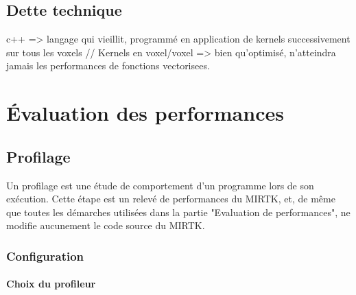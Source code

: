 \documentclass[10pt]{report}
\begin{document}
	\subsection{Dette technique}
	
c++ => langage qui vieillit, programmé en application de kernels successivement sur tous les voxels	//
Kernels en voxel/voxel => bien qu'optimisé, n'atteindra jamais les performances de fonctions vectorisees.
	
	
	
	\section{Évaluation des performances}
		\subsection{Profilage}
Un profilage est une étude de comportement d'un programme lors de son exécution. Cette étape est un relevé de performances du MIRTK, et, de même que toutes les démarches utilisées dans la partie "Evaluation de performances", ne modifie aucunement le code source du MIRTK. 

		\subsubsection{Configuration}
			\paragraph{Choix du profileur}~\par
\end{document}
